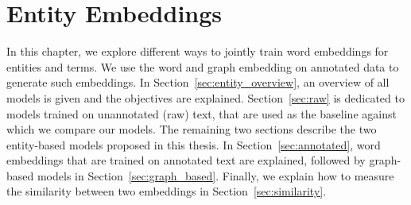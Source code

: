 \chapter{Entity Embeddings}\label{chap:entity}

In this chapter, we explore different ways to jointly train word embeddings for entities and terms. We use the word and graph embedding on annotated data to generate such embeddings. In Section~\ref{sec:entity_overview}, an overview of all models is given and the objectives are explained. Section~\ref{sec:raw} is dedicated to models trained on unannotated (raw) text, that are used as the baseline against which we compare our models. The remaining two sections describe the two entity-based models proposed in this thesis. In Section~\ref{sec:annotated}, word embeddings that are trained on annotated text are explained, followed by graph-based models in Section~\ref{sec:graph_based}. Finally, we explain how to measure the similarity between two embeddings in Section~\ref{sec:similarity}.

